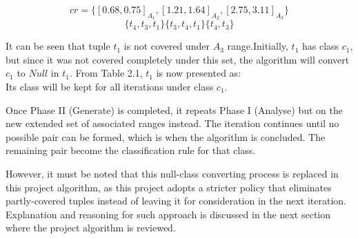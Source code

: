 \begin{description}
\[ cr = \{[0.68, 0.75]_{A_1}, [1.21,1.64]_{A_2}, [2.75,3.11]_{A_3}\} \] 
\[ \{t_4,t_3,t_1\} { } \{t_3,t_4,t_1\} { } \{t_4, t_3\} \] 

It can be seen that tuple $t_1$ is not covered under $A_3$ range.Initially, $t_1$ has class $c_1$, but since it was not covered completely under this set, the algorithm will convert $c_1$ to $Null$ in $t_1$. From Table 2.1, $t_1$ is now presented as: \\



Its class will be kept for all iterations under class $c_1$. 

Once Phase II (Generate) is completed, it repeats Phase I (Analyse) but on the new extended set of associated ranges instead. The iteration continues until no possible pair can be formed, which is when the algorithm is concluded. The remaining pair become the classification rule for that class. 

However, it must be noted that this null-class converting process is replaced in this project algorithm, as this project adopts a stricter policy that eliminates partly-covered tuples instead of leaving it for consideration in the next iteration. Explanation and reasoning for such approach is discussed in the next section where the project algorithm is reviewed.

\end{description}
















